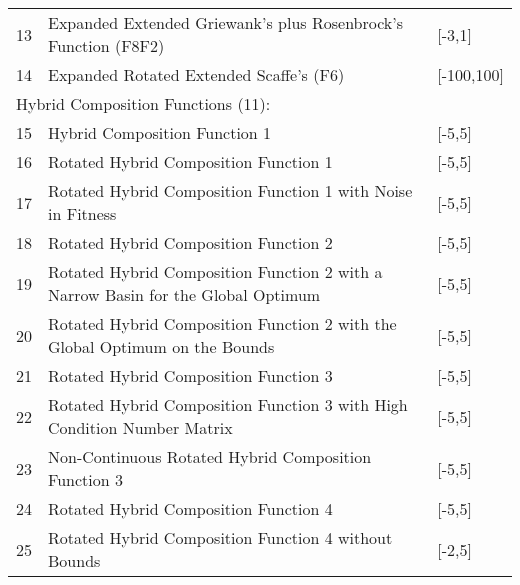 \begin{table}[t]
\begin{tabular}{lp{9cm}l}
13  &Expanded Extended Griewank's  plus Rosenbrock's  Function (F8F2)                    & [-3,1]\\
14  &Expanded Rotated Extended Scaffe's  (F6)                                & [-100,100]\\
\multicolumn{3}{l}{Hybrid Composition Functions (11):}\\
15  &Hybrid Composition Function 1                                       & [-5,5]\\
16  &Rotated Hybrid Composition Function 1                               & [-5,5]\\
17  &Rotated Hybrid Composition Function 1 with Noise in Fitness                     & [-5,5]\\
18  &Rotated Hybrid Composition Function 2                               & [-5,5]\\
19  &Rotated Hybrid Composition Function 2 with a Narrow Basin for the Global Optimum    & [-5,5]\\
20  &Rotated Hybrid Composition Function 2 with the Global Optimum on the Bounds         & [-5,5]\\
21  &Rotated Hybrid Composition Function 3                           & [-5,5]\\
22  &Rotated Hybrid Composition Function 3 with High Condition Number Matrix         & [-5,5]\\
23  &Non-Continuous Rotated Hybrid Composition Function 3                        & [-5,5]\\
24  &Rotated Hybrid Composition Function 4                               & [-5,5]\\
25  &Rotated Hybrid Composition Function 4 without Bounds                            & [-2,5]\\
\end{tabular}
\caption{}
\label{tab:benchmark-func-data}
\end{table}




